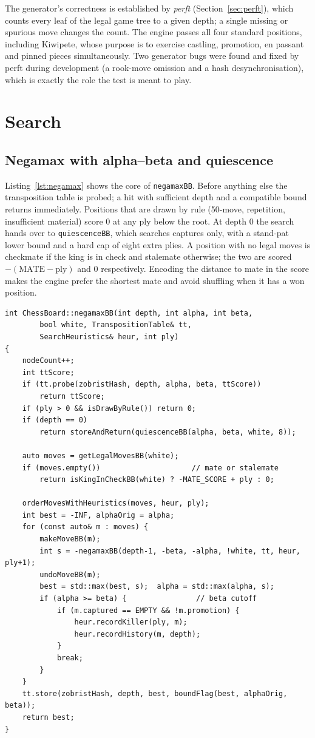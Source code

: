 \documentclass[conference]{IEEEtran}
\begin{document}
The generator's correctness is established by \emph{perft} (Section~\ref{sec:perft}), which counts every leaf of the legal game tree to a given depth; a single missing or spurious move changes the count. The engine passes all four standard positions, including Kiwipete, whose purpose is to exercise castling, promotion, en passant and pinned pieces simultaneously. Two generator bugs were found and fixed by perft during development (a rook-move omission and a hash desynchronisation), which is exactly the role the test is meant to play.

\section{Search}
\subsection{Negamax with alpha--beta and quiescence}
Listing~\ref{lst:negamax} shows the core of \texttt{negamaxBB}. Before anything else the transposition table is probed; a hit with sufficient depth and a compatible bound returns immediately. Positions that are drawn by rule (50-move, repetition, insufficient material) score 0 at any ply below the root. At depth 0 the search hands over to \texttt{quiescenceBB}, which searches captures only, with a stand-pat lower bound and a hard cap of eight extra plies. A position with no legal moves is checkmate if the king is in check and stalemate otherwise; the two are scored $-(\mathrm{MATE}-\mathrm{ply})$ and 0 respectively. Encoding the distance to mate in the score makes the engine prefer the shortest mate and avoid shuffling when it has a won position.

\begin{lstlisting}[caption={Negamax with alpha--beta, transposition table and quiescence (abridged from \texttt{ChessBoard.cpp}).},label=lst:negamax]
int ChessBoard::negamaxBB(int depth, int alpha, int beta,
        bool white, TranspositionTable& tt,
        SearchHeuristics& heur, int ply)
{
    nodeCount++;
    int ttScore;
    if (tt.probe(zobristHash, depth, alpha, beta, ttScore))
        return ttScore;
    if (ply > 0 && isDrawByRule()) return 0;
    if (depth == 0)
        return storeAndReturn(quiescenceBB(alpha, beta, white, 8));

    auto moves = getLegalMovesBB(white);
    if (moves.empty())                     // mate or stalemate
        return isKingInCheckBB(white) ? -MATE_SCORE + ply : 0;

    orderMovesWithHeuristics(moves, heur, ply);
    int best = -INF, alphaOrig = alpha;
    for (const auto& m : moves) {
        makeMoveBB(m);
        int s = -negamaxBB(depth-1, -beta, -alpha, !white, tt, heur, ply+1);
        undoMoveBB(m);
        best = std::max(best, s);  alpha = std::max(alpha, s);
        if (alpha >= beta) {                // beta cutoff
            if (m.captured == EMPTY && !m.promotion) {
                heur.recordKiller(ply, m);
                heur.recordHistory(m, depth);
            }
            break;
        }
    }
    tt.store(zobristHash, depth, best, boundFlag(best, alphaOrig, beta));
    return best;
}
\end{lstlisting}
\end{document}
